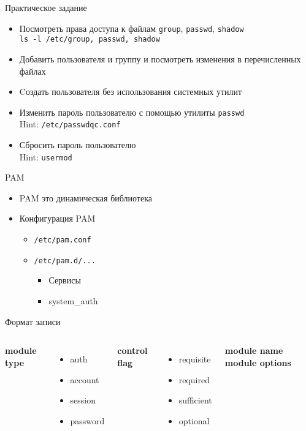 \begin{frame}{Практическое задание}
    \begin{itemize}
		\item Посмотреть права доступа к файлам {\tt group}, {\tt passwd}, {\tt shadow}\\
			{\tt ls -l /etc/{group, passwd, shadow}}
		\item Добавить пользователя и группу и посмотреть изменения в перечисленных файлах
		\item Cоздать пользователя без использования системных утилит
    \end{itemize}
	\pause
	 \begin{itemize}
		\item Изменить пароль пользователю с помощью утилиты {\tt passwd}\\
			Hint: {\tt /etc/passwdqc.conf}
		\item Сбросить пароль пользователю\\
			Hint: {\tt usermod}
    \end{itemize}
\end{frame}


\begin{frame}{PAM}
	\begin{itemize}
		\item PAM это динамическая библиотека
		\item Конфигурация PAM
			\begin{itemize}
				\item {\tt /etc/pam.conf}
				\item {\tt /etc/pam.d/...}
					\begin{itemize}
						\item Сервисы
						\item system\_auth
					\end{itemize}
			\end{itemize}
	\end{itemize}

	\begin{block}{Формат записи}
		\begin{columns}
			\textbf{module type}
			 \begin{itemize}
				 \item auth
				 \item account
				 \item session
				 \item password
			 \end{itemize}
			 \textbf{control flag}
			 \begin{itemize}
				 \item requisite
				 \item required
				 \item sufficient
				 \item optional
			 \end{itemize}
			 \textbf{module name}
			 \textbf{module options}
		 \end{columns}
	 \end{block}
\end{frame}

